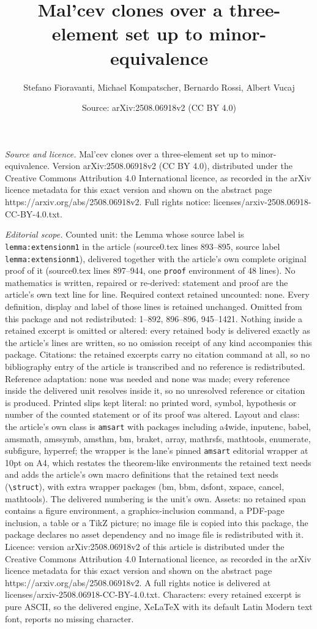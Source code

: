\documentclass[10pt,a4paper]{amsart}
\title[Mal'cev clones over a three-element set up to minor-equivale]{Mal'cev clones over a three-element set up to minor-equivalence}
\author{Stefano Fioravanti, Michael Kompatscher, Bernardo Rossi, Albert Vucaj}
\date{Source: arXiv:2508.06918v2 (CC BY 4.0)}
\begin{document}
\maketitle

\noindent\emph{Source and licence.} Mal'cev clones over a three-element set up to minor-equivalence. Version arXiv:2508.06918v2 (CC BY 4.0), distributed under the Creative Commons Attribution 4.0 International licence, as recorded in the arXiv licence metadata for this exact version and shown on the abstract page https://arxiv.org/abs/2508.06918v2. Full rights notice: licenses/arxiv-2508.06918-CC-BY-4.0.txt.\par\smallskip

\noindent\textit{Editorial scope.} Counted unit: the Lemma whose source label is \texttt{lemma:extensionm1} in the article (source0.tex lines 893--895, source label \texttt{lemma:extensionm1}), delivered together with the article's own complete original proof of it (source0.tex lines 897--944, one \texttt{proof} environment of 48 lines). No mathematics is written, repaired or re-derived: statement and proof are the article's own text line for line. Required context retained uncounted: none. Every definition, display and label of those lines is retained unchanged. Omitted from this package and not redistributed: 1--892, 896--896, 945--1421. Nothing inside a retained excerpt is omitted or altered: every retained body is delivered exactly as the article's lines are written, so no omission receipt of any kind accompanies this package. Citations: the retained excerpts carry no citation command at all, so no bibliography entry of the article is transcribed and no reference is redistributed. Reference adaptation: none was needed and none was made; every reference inside the delivered unit resolves inside it, so no unresolved reference or citation is produced. Printed slips kept literal: no printed word, symbol, hypothesis or number of the counted statement or of its proof was altered. Layout and class: the article's own class is \texttt{amsart} with packages including a4wide, inputenc, babel, amsmath, amssymb, amsthm, bm, braket, array, mathrsfs, mathtools, enumerate, subfigure, hyperref; the wrapper is the lane's pinned \texttt{amsart} editorial wrapper at 10pt on A4, which restates the theorem-like environments the retained text needs and adds the article's own macro definitions that the retained text needs (\texttt{\textbackslash struct}), with extra wrapper packages (bm, bbm, dsfont, xspace, cancel, mathtools). The delivered numbering is the unit's own. Assets: no retained span contains a figure environment, a graphics-inclusion command, a PDF-page inclusion, a table or a TikZ picture; no image file is copied into this package, the package declares no asset dependency and no image file is redistributed with it. Licence: version arXiv:2508.06918v2 of this article is distributed under the Creative Commons Attribution 4.0 International licence, as recorded in the arXiv licence metadata for this exact version and shown on the abstract page https://arxiv.org/abs/2508.06918v2. A full rights notice is delivered at licenses/arxiv-2508.06918-CC-BY-4.0.txt. Characters: every retained excerpt is pure ASCII, so the delivered engine, XeLaTeX with its default Latin Modern text font, reports no missing character.
\end{document}
